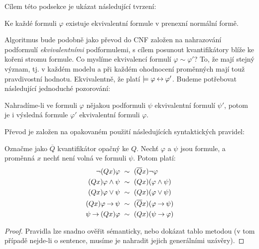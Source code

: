 Cílem této podsekce je ukázat následující tvrzení:

\begin{proposition}\label{proposition:convert-to-pnf}
    Ke každé formuli $\varphi$ existuje ekvivalentní formule v prenexní normální formě.    
\end{proposition}

Algoritmus bude podobně jako převod do CNF založen na nahrazování podformulí \emph{ekvivalentními} podformulemi, s cílem posunout kvantifikátory blíže ke kořeni stromu formule. Co myslíme ekvivalencí formulí $\varphi\sim\varphi'$? To, že mají stejný význam, tj. v každém modelu a při každém ohodnocení proměnných mají touž pravdivostní hodnotu. Ekvivalentně, že platí $\models\varphi\mathbin{\leftrightarrow}\varphi'$. Budeme potřebovat následující jednoduché pozorování:

\begin{observation}\label{observation:pnf-one-step}
    Nahradíme-li ve formuli $\varphi$ nějakou podformuli $\psi$ ekvivalentní formulí $\psi'$, potom je i výsledná formule $\varphi'$ ekvivalentní formuli $\varphi$.
\end{observation}

Převod je založen na opakovaném použití následujících syntaktických pravidel:

\begin{lemma}\label{lemma:pnf-conversion-rules}
    Označme jako $\overline{Q}$ kvantifikátor opačný ke $Q$. Nechť $\varphi$ a $\psi$ jsou formule, a proměnná $x$ nechť není volná ve formuli $\psi$. Potom platí:
    \begin{align*}
        \neg (Qx)\varphi\ &\sim\ (\overline{Q}x)\neg\varphi\\
        (Qx)\varphi \land \psi\ &\sim\ (Qx)(\varphi \land \psi)\\
        (Qx)\varphi \lor \psi\ &\sim\ (Qx)(\varphi \lor \psi)\\
        (Qx)\varphi \mathbin{\rightarrow} \psi\ &\sim\ (\overline{Q}x)(\varphi \mathbin{\rightarrow} \psi)\\
        \psi \mathbin{\rightarrow} (Qx)\varphi\ &\sim\ (Qx)(\psi \mathbin{\rightarrow} \varphi)
    \end{align*}
\end{lemma}
\begin{proof}
    Pravidla lze snadno ověřit sémanticky, nebo dokázat tablo metodou (v tom případě nejde-li o sentence, musíme je nahradit jejich generálními uzávěry).   
\end{proof}

